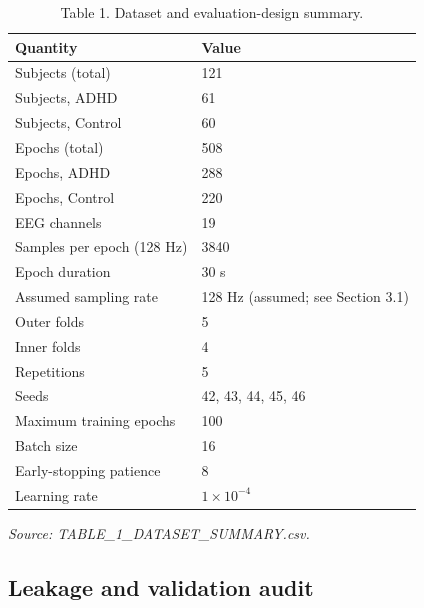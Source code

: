 \documentclass[a4paper,fleqn]{cas-sc}
\begin{document}
\begin{table}[htbp]
\centering
\small
\caption{Table 1. Dataset and evaluation-design summary.}
\begin{tabular}{ll}
\toprule
Quantity & Value \\
\midrule
Subjects (total) & 121 \\
Subjects, ADHD & 61 \\
Subjects, Control & 60 \\
Epochs (total) & 508 \\
Epochs, ADHD & 288 \\
Epochs, Control & 220 \\
EEG channels & 19 \\
Samples per epoch (128 Hz) & 3840 \\
Epoch duration & 30 s \\
Assumed sampling rate & 128 Hz (assumed; see Section 3.1) \\
Outer folds & 5 \\
Inner folds & 4 \\
Repetitions & 5 \\
Seeds & 42, 43, 44, 45, 46 \\
Maximum training epochs & 100 \\
Batch size & 16 \\
Early-stopping patience & 8 \\
Learning rate & $1\times10^{-4}$ \\
\bottomrule
\end{tabular}
\end{table}

\textit{Source: TABLE\_1\_DATASET\_SUMMARY.csv.}



\subsection{Leakage and validation audit}
\end{document}
